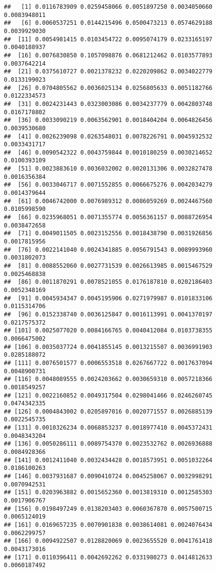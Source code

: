 \documentclass[
]{article}
\begin{document}
\begin{verbatim}
##   [1] 0.0116783909 0.0259458066 0.0051897250 0.0034050660 0.0083948011
##   [6] 0.0060537251 0.0144215496 0.0500473213 0.0574629188 0.0039929030
##  [11] 0.0054981415 0.0103454722 0.0095074179 0.0233165197 0.0040188937
##  [16] 0.0076830850 0.1057098876 0.0681212462 0.0103577893 0.0037642214
##  [21] 0.0375610727 0.0021378232 0.0220209862 0.0034022779 0.0133199023
##  [26] 0.0704805562 0.0036025134 0.0256805633 0.0051182766 0.0122334573
##  [31] 0.0024231443 0.0323003086 0.0034237779 0.0042803748 0.0167178802
##  [36] 0.0033090219 0.0063562901 0.0018404204 0.0064826456 0.0039530680
##  [41] 0.0026239098 0.0263548031 0.0078226791 0.0045932532 0.0033431717
##  [46] 0.0090542322 0.0043759844 0.0010180259 0.0030214652 0.0100393109
##  [51] 0.0023883610 0.0036032002 0.0020131306 0.0032827478 0.0016356384
##  [56] 0.0033046717 0.0071552855 0.0066675276 0.0042034279 0.0014379644
##  [61] 0.0046742000 0.0076989312 0.0086059269 0.0024467560 0.0105998590
##  [66] 0.0235968051 0.0071355774 0.0056361157 0.0088726954 0.0038472658
##  [71] 0.0049011505 0.0023152556 0.0018438790 0.0031926856 0.0017815956
##  [76] 0.0022141040 0.0024341885 0.0056791543 0.0089993960 0.0031802073
##  [81] 0.0088552060 0.0027731539 0.0026613985 0.0015467529 0.0025468838
##  [86] 0.0011870291 0.0078521055 0.0176187810 0.0202186403 0.0052348169
##  [91] 0.0045934347 0.0045195906 0.0271979987 0.0101833106 0.0115314706
##  [96] 0.0152338740 0.0036125847 0.0016113991 0.0041370197 0.0217575372
## [101] 0.0025077020 0.0084166765 0.0040412084 0.0103738355 0.0066475002
## [106] 0.0035037724 0.0041855145 0.0013215507 0.0036991903 0.0285188072
## [111] 0.0076501577 0.0006553518 0.0267667722 0.0017637094 0.0048900731
## [116] 0.0048089555 0.0024203662 0.0030659310 0.0057218366 0.0018549257
## [121] 0.0022160852 0.0049317504 0.0298041466 0.0246260745 0.0474342335
## [126] 0.0004843002 0.0205897016 0.0020771557 0.0026885139 0.0022545735
## [131] 0.0010326234 0.0068853237 0.0018977410 0.0045372431 0.0048343204
## [136] 0.0050286111 0.0089754370 0.0023532762 0.0026936888 0.0084928366
## [141] 0.0012411040 0.0032434428 0.0018573951 0.0051032264 0.0186100263
## [146] 0.0037931687 0.0090410724 0.0045258067 0.0032998291 0.0070942531
## [151] 0.0203963882 0.0015652360 0.0013819310 0.0012585303 0.0017906767
## [156] 0.0198497249 0.0138203403 0.0060367870 0.0057500715 0.0065124019
## [161] 0.0169657235 0.0070901838 0.0038614081 0.0024076434 0.0062299757
## [166] 0.0094922507 0.0128820069 0.0023655520 0.0041761418 0.0043173016
## [171] 0.0110396411 0.0042692262 0.0331980273 0.0414812633 0.0060187492

\end{verbatim}
\end{document}
